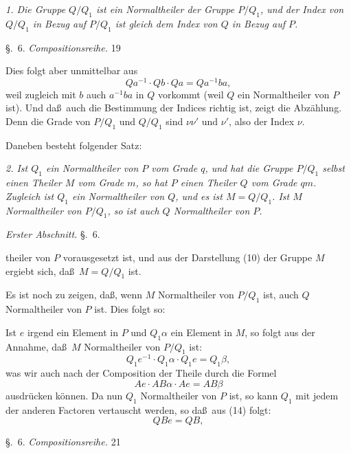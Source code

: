 \documentclass[12pt,a4paper]{book}
\begin{document}
\textit{1. Die Gruppe $Q/Q_1$ ist ein Normaltheiler der Gruppe $P/Q_1$, und der Index von $Q/Q_1$ in Bezug auf $P/Q_1$ ist gleich dem Index von $Q$ in Bezug auf $P$.}

\newpage
\noindent\S.~6. \hfill \textit{Compositionsreihe.} \hfill 19

\vspace{0.3cm}

Dies folgt aber unmittelbar aus
\[Qa^{-1} \cdot Qb \cdot Qa = Qa^{-1}ba,\]
weil zugleich mit $b$ auch $a^{-1}ba$ in $Q$ vorkommt (weil $Q$ ein Normaltheiler von $P$ ist). Und da\ss\ auch die Bestimmung der Indices richtig ist, zeigt die Abz\"ahlung. Denn die Grade von $P/Q_1$ und $Q/Q_1$ sind $\nu\nu'$ und $\nu'$, also der Index $\nu$.

Daneben besteht folgender Satz:

\textit{2. Ist $Q_1$ ein Normaltheiler von $P$ vom Grade $q$, und hat die Gruppe $P/Q_1$ selbst einen Theiler $M$ vom Grade $m$, so hat $P$ einen Theiler $Q$ vom Grade $qm$. Zugleich ist $Q_1$ ein Normaltheiler von $Q$, und es ist $M = Q/Q_1$. Ist $M$ Normaltheiler von $P/Q_1$, so ist auch $Q$ Normaltheiler von $P$.}

\newpage
{} \hfill \textit{Erster Abschnitt.} \hfill \S.~6.

\vspace{0.3cm}

theiler von $P$ vorausgesetzt ist, und aus der Darstellung (10) der Gruppe $M$ ergiebt sich, da\ss\ $M = Q/Q_1$ ist.

Es ist noch zu zeigen, da\ss, wenn $M$ Normaltheiler von $P/Q_1$ ist, auch $Q$ Normaltheiler von $P$ ist. Dies folgt so:

Ist $e$ irgend ein Element in $P$ und $Q_1\alpha$ ein Element in $M$, so folgt aus der Annahme, da\ss\ $M$ Normaltheiler von $P/Q_1$ ist:
\[Q_1e^{-1} \cdot Q_1\alpha \cdot Q_1e = Q_1\beta,\]
was wir auch nach der Composition der Theile durch die Formel
\[Ae \cdot AB\alpha \cdot Ae = AB\beta\]
ausdr\"ucken k\"onnen. Da nun $Q_1$ Normaltheiler von $P$ ist, so kann $Q_1$ mit jedem der anderen Factoren vertauscht werden, so da\ss\ aus (14) folgt:
\[QBe = QB,\]

\newpage
\noindent\S.~6. \hfill \textit{Compositionsreihe.} \hfill 21

\vspace{0.3cm}
\end{document}
